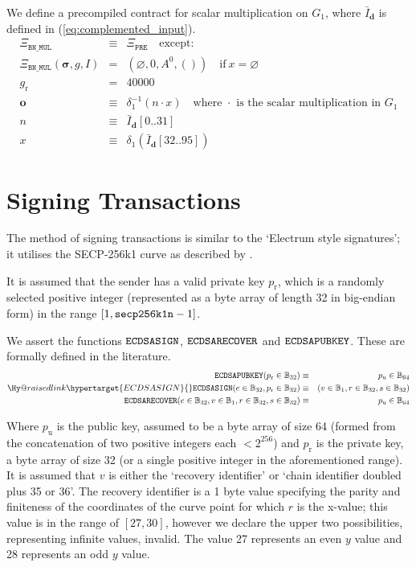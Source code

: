 \documentclass[9pt,oneside]{amsart}
\makeatletter
\newcommand{\linkdest}[1]{\Hy@raisedlink{\hypertarget{#1}{}}}
\makeatother
\begin{document}
We define a precompiled contract for scalar multiplication on $G_1$, where $\bar I_{\mathbf d}$ is defined in (\ref{eq:complemented_input}).
\begin{eqnarray}
\Xi_{\mathtt{BN\_MUL}}&\equiv&\Xi_{\mathtt{PRE}}\quad\text{except:}\\
\Xi_{\mathtt{BN\_MUL}}(\boldsymbol\sigma,g,I)&=&(\varnothing,0,A^0,())\quad\text{if}\ x=\varnothing\\
g_{\mathrm{r}} &=& 40000\\
\mathbf o&\equiv&\delta_1^{-1}(n\cdot x)\quad\text{where $\cdot$ is the scalar multiplication in $G_1$}\\
n&\equiv&\bar I_{\mathbf d}[0..31]\\
x&\equiv&\delta_1(\bar I_{\mathbf d}[32..95])
\end{eqnarray}

\section{Signing Transactions}\label{app:signing}

The method of signing transactions is similar to the `Electrum style signatures'; it utilises the SECP-256k1 curve as described by \cite{gura2004comparing}.

It is assumed that the sender has a valid private key $p_{\mathrm{r}}$, which is a randomly selected positive integer (represented as a byte array of length 32 in big-endian form) in the range \hbox{$[1, \mathtt{\tiny secp256k1n} - 1]$}.

We assert the functions $\mathtt{\small ECDSASIGN}$, $\mathtt{\small ECDSARECOVER}$ and $\mathtt{\small ECDSAPUBKEY}$. These are formally defined in the literature.
\begin{eqnarray}
\mathtt{\small ECDSAPUBKEY}(p_{\mathrm{r}} \in \mathbb{B}_{32}) & \equiv & p_{\mathrm{u}} \in \mathbb{B}_{64} \\
\linkdest{ECDSASIGN}{}\mathtt{\small ECDSASIGN}(e \in \mathbb{B}_{32}, p_{\mathrm{r}} \in \mathbb{B}_{32}) & \equiv & (v \in \mathbb{B}_{1}, r \in \mathbb{B}_{32}, s \in \mathbb{B}_{32}) \\
\mathtt{\small ECDSARECOVER}(e \in \mathbb{B}_{32}, v \in \mathbb{B}_{1}, r \in \mathbb{B}_{32}, s \in \mathbb{B}_{32}) & \equiv & p_{\mathrm{u}} \in \mathbb{B}_{64}
\end{eqnarray}

Where $p_{\mathrm{u}}$ is the public key, assumed to be a byte array of size 64 (formed from the concatenation of two positive integers each $< 2^{256}$) and $p_{\mathrm{r}}$ is the private key, a byte array of size 32 (or a single positive integer in the \hypertarget{v}{}aforementioned range). It is assumed that $v$ is either the `recovery identifier' or `chain identifier doubled plus 35 or 36'. The recovery identifier is a 1 byte value specifying the parity and finiteness of the coordinates of the curve point for which $r$ is the x-value; this value is in the range of $[27, 30]$, however we declare the upper two possibilities, representing infinite values, invalid. The value 27 represents an even $y$ value and 28 represents an odd $y$ value.
\end{document}
